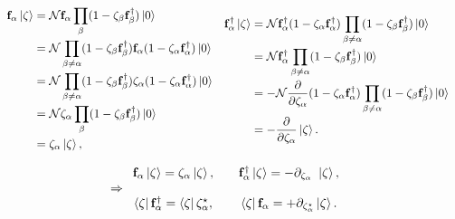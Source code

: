 \documentclass{homework}
\begin{document}
\begin{equation} \begin{array}{cc}
    \begin{split}
        {\bf f}_{\alpha} \ket{\zeta} &= \mathcal{N} {\bf f}_{\alpha} \prod_{\beta}  (1-\zeta_{\beta} {\bf f}_{\beta}^\dagger) \ket{0} \\
        & = \mathcal{N} \prod_{\beta \neq \alpha}  (1-\zeta_{\beta} {\bf f}_{\beta}^\dagger) {\bf f}_{\alpha}  (1-\zeta_{\alpha} {\bf f}_{\alpha}^\dagger) \ket{0} \\
        &= \mathcal{N} \prod_{\beta \neq \alpha}  (1-\zeta_{\beta} {\bf f}_{\beta}^\dagger) {\zeta}_{\alpha} (1-\zeta_{\alpha} {\bf f}_{\alpha}^\dagger) \ket{0} \\
        &= \mathcal{N} \zeta_{\alpha} \prod_{\beta}  (1-\zeta_{\beta} {\bf f}_{\beta}^\dagger) \ket{0} \\
        &= \zeta_{\alpha} \ket{\zeta},
    \end{split} & \begin{split}
         {\bf f}_{\alpha}^\dagger \ket{\zeta} 
         &= \mathcal{N}{\bf f}_{\alpha}^\dagger (1-\zeta_{\alpha} {\bf f}_{\alpha}^\dagger) \prod_{\beta \neq \alpha} (1-\zeta_{\beta} {\bf f}_{\beta}^\dagger) \ket{0} \\
         &= \mathcal{N}{\bf f}_{\alpha}^\dagger \prod_{\beta \neq \alpha} (1-\zeta_{\beta} {\bf f}_{\beta}^\dagger) \ket{0} \\
         &= - \mathcal{N}\frac{\partial}{\partial \zeta_\alpha} (1- \zeta_{\alpha} {\bf f}_{\alpha}^\dagger) \prod_{\beta \neq \alpha} (1-\zeta_{\beta} {\bf f}_{\beta}^\dagger) \ket{0} \\
         &= - \frac{\partial}{\partial \zeta_\alpha} \ket{\zeta}.
    \end{split} 
\end{array} 
\end{equation}

\begin{equation}
    \Rightarrow \begin{array}{ccc}
    {{\bf f}}_{\alpha} \ket{\zeta} = \zeta_\alpha \ket{\zeta}, &  & {{\bf f}}_{\alpha}^\dagger \ket{\zeta} = - \partial_{\zeta_\alpha} \textnormal{ } \ket{\zeta},  \\ 
    \\
    \bra{\zeta} {{\bf f}}_{\alpha}^\dagger = \bra{\zeta} \zeta_\alpha^\star, & & \bra{\zeta} {{\bf f}}_{\alpha} = + \partial_{\zeta_\alpha^\star} \ket{\zeta}. \end{array}
\end{equation}
\end{document}
